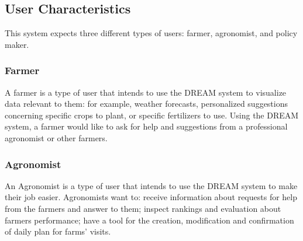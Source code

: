 %

\subsection{User Characteristics}
\begin{flushleft}
This system expects three different types of users: farmer, agronomist, and policy maker.
\subsubsection{Farmer}
A farmer is a type of user that intends to use the DREAM system to visualize data relevant to them: for example, weather forecasts, personalized suggestions concerning specific crops to plant, or specific fertilizers to use.
Using the DREAM system, a farmer would like to ask for help and suggestions from a professional agronomist or other farmers.\\
\subsubsection{Agronomist}
An Agronomist is a type of user that intends to use the DREAM system to make their job easier. Agronomists want to: receive information about requests for help from the farmers and answer to them; inspect rankings and evaluation about farmers performance; have a tool for the creation, modification and confirmation of daily plan for farms' visits.

\end{flushleft}
